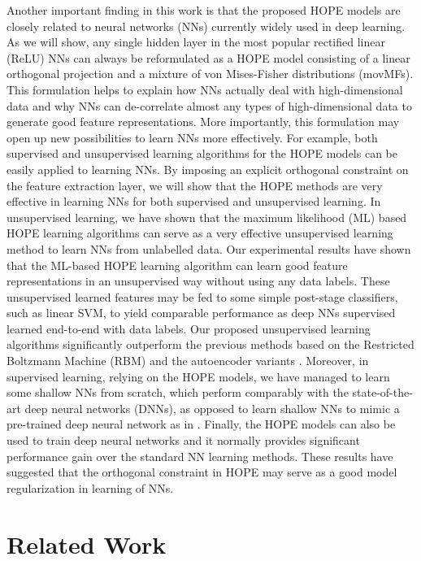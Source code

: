\documentclass[11pt]{article}
\begin{document}
Another important finding in this work is that the proposed HOPE models are closely related to neural networks (NNs) currently  widely used in deep learning. As we will show, any single hidden layer in the most popular rectified linear (ReLU) NNs can always be reformulated as a HOPE model consisting of a linear orthogonal projection and a mixture of von Mises-Fisher 
distributions (movMFs). This formulation helps to explain how NNs actually deal with high-dimensional data and why NNs can de-correlate almost any types of high-dimensional data to generate good feature representations. 
More importantly, this formulation may open up new possibilities to learn NNs more effectively. 
For example, both supervised and unsupervised learning algorithms for the HOPE models can be easily applied to learning NNs. By imposing an explicit orthogonal constraint on the feature extraction layer, we will show that the HOPE methods are very effective in learning NNs for both supervised and unsupervised learning. 
In unsupervised learning, we have shown that the maximum likelihood (ML) based HOPE learning algorithms can serve as a very effective unsupervised learning method to learn NNs from unlabelled data. Our experimental results have shown that the ML-based HOPE learning algorithm can learn good feature representations in an unsupervised way without using any data labels. These unsupervised learned features may be fed to some simple post-stage classifiers, such as linear SVM, to yield comparable performance as  deep NNs supervised learned end-to-end with data labels. Our proposed unsupervised learning algorithms significantly outperform the previous methods based on the Restricted Boltzmann Machine (RBM) \cite{Hinton_2006a} and the autoencoder variants \cite{Bengio07greedylayer-wise,Vincent-2008}.
Moreover, in supervised learning, 
relying on the HOPE models, we have managed to learn some shallow NNs from scratch, which perform comparably with the state-of-the-art deep neural networks (DNNs), as opposed to learn shallow NNs to mimic a pre-trained deep neural network as in \cite{NIPS2014_DNN_no_need_deep}. Finally, the HOPE models can also be used to train deep neural networks and it normally provides significant performance gain over the standard NN learning methods. These results have suggested that the orthogonal constraint in HOPE may serve as a good model regularization in learning of NNs. 


\section{Related Work}
\label{sec_related_work}
\end{document}
